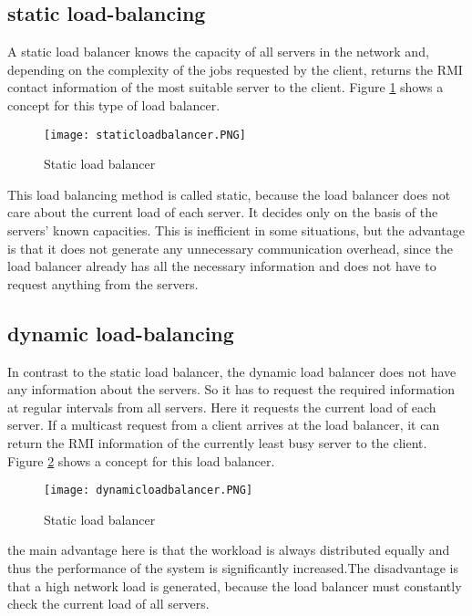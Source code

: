 \subsection{static load-balancing}
A static load balancer knows the capacity of all servers in the network and, depending on the complexity of the jobs requested by the client, returns the RMI contact information of the most suitable server to the client. Figure \ref{staticloadbalancer} shows a concept for this type of load balancer.
\begin{figure}[H]
	\centering
	\texttt{[image: staticloadbalancer.PNG]}
	\caption{Static load balancer}
	\label{staticloadbalancer}
\end{figure} 
This load balancing method is called static, because the load balancer does not care about the current load of each server. It decides only on the basis of the servers' known capacities. This is inefficient in some situations, but the advantage is that it does not generate any unnecessary communication overhead, since the load balancer already has all the necessary information and does not have to request anything from the servers.
\subsection{dynamic load-balancing}
In contrast to the static load balancer, the dynamic load balancer does not have any information about the servers. So it has to request the required information at regular intervals from all servers. Here it requests the current load of each server. If a multicast request from a client arrives at the load balancer, it can return the RMI information of the currently least busy server to the client. Figure \ref{dynamicloadbalancer} shows a concept for this load balancer.
\begin{figure}[H]
	\centering
	\texttt{[image: dynamicloadbalancer.PNG]}
	\caption{Static load balancer}
	\label{dynamicloadbalancer}
\end{figure} 
the main advantage here is that the workload is always distributed equally and thus the performance of the system is significantly increased.The disadvantage is that a high network load is generated, because the load balancer must constantly check the current load of all servers.
